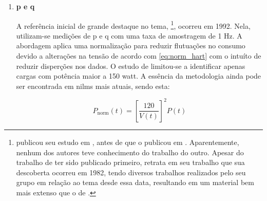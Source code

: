 \begin{enumerate}[label=\textbf{1.\arabic*},wide=\parindent]
\item \textbf{\Acrlong{p} e \Acrlong{q}}
\label{nilm:pot_real_reat}

\indent A referência inicial de grande destaque no tema,
\citet*{nilm_hart_1992_8}\footnote{\citet*{nilm_sultanem_1991_10}
publicou seu estudo em \citeyear{nilm_sultanem_1991_10}, antes de 
\citeauthor*{nilm_hart_1992_8} que o publicou em
\citeyear{nilm_hart_1992_8}. Aparentemente, nenhum dos autores teve
conhecimento do trabalho do outro. Apesar do trabalho de
\citeauthor*{nilm_sultanem_1991_10} ter sido publicado primeiro,
\citeauthor*{nilm_hart_1992_8} retrata em seu trabalho que sua descoberta
ocorreu em 1982, tendo diversos trabalhos realizados pelo seu grupo em
relação ao tema desde essa data, resultando em um material bem mais
extenso que o de \citeauthor*{nilm_sultanem_1991_10}.}, ocorreu em
1992. Nela, utilizam-se medições de
\gls{p} e \gls{q} com uma taxa de amostragem de 1 Hz. A abordagem
aplica uma normalização para reduzir flutuações no consumo devido a
alterações na tensão de acordo com \ref{eq:norm_hart} com o intuíto de
reduzir disperções nos dados. O estudo de \citeauthor*{nilm_hart_1992_8}
limitou-se a identificar apenas cargas com potência maior a 150
\acs{watt}. A essência da metodologia ainda pode ser encontrada
em \glspl{nilm} mais atuais, sendo esta: 

\begin{equation} \label{eq:norm_hart}
P_{\text{norm}}(t) = \left[ \frac{120}{V(t)} \right]^2 P(t)
\end{equation}


\end{enumerate}
